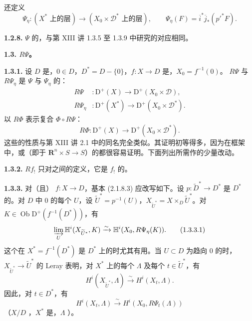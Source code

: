 还定义
\[
 \Psi_\eta:(X^*\text{ 上的层})\longrightarrow
 (X_0\times\mathscr D^*\text{ 上的层}),\qquad
 \Psi_\eta(F)=\overline i^*\overline j_*(p'^*F).
\]

\textbf{1.2.8.} $\Psi$ 的，与第 XIII 讲 1.3.5 至 1.3.9 中研究的对应相同。

\textbf{1.3.  $R\Psi$。}

\textbf{1.3.1.} 设 $D$ 是，$0\in D$，$D^*=D-\{0\}$，$f:X\to D$ 是，$X_0=f^{-1}(0)$。 $R\Psi$ 与 $R\Psi_\eta$ 是 $\Psi$ 与 $\Psi_\eta$ 的：
\[
\begin{aligned}
 R\Psi&:\mathrm D^+(X)\longrightarrow\mathrm D^+(X_0\times\mathscr D),\\
 R\Psi_\eta&:\mathrm D^+(X^*)\longrightarrow\mathrm D^+(X_0\times\mathscr D^*).
\end{aligned}
\]
以 $R\Phi$ 表示复合 $\Phi\circ R\Psi$：
\[
 R\Phi:\mathrm D^+(X)\longrightarrow\mathrm D^+(X_0\times\mathscr D^*).
\]
这些的性质与第 XIII 讲 2.1 中的同名完全类似。其证明初等得多，因为在框架中，或（即于 $\mathbf R^n\times S\to S$）的都很容易证明。下面列出所需作的少量改动。

\textbf{1.3.2.}  $Rf_!$ 只对之间的定义，它是 $f_!$ 的。

\textbf{1.3.3.} 对（且） $f:X\to D$，基本 (2.1.8.3) 应改写如下。设 $p:\widetilde D^*\to D^*$ 是 $D^*$ 的。对 $D$ 中 $0$ 的每个 $U$，设 $\widetilde U^*=p^{-1}(U)$，$X_{\widetilde U^*}=X\times_D\widetilde U^*$。对 $K\in\operatorname{Ob}\mathrm D^+(f^{-1}(D^*))$，有
\[
 \varinjlim_U\mathbb H^i(X_{\widetilde U^*},K)
 \xrightarrow{\sim}\mathbb H^i(X_0,R\Psi_\eta(K)).\tag{1.3.3.1}
\]
这个在 $X^*=f^{-1}(D^*)$ 是 $D^*$ 上的时尤其有用。当 $U\subset D$ 为趋向 $0$ 的时，
$X_{\widetilde U^*}\to\widetilde U^*$ 的 Leray 表明，对 $X^*$ 上的每个 $\Lambda$ 及每个 $t\in\widetilde U^*$，有
\[
 H^i(X_{\widetilde U^*},\Lambda)\xrightarrow{\sim}H^i(X_t,\Lambda).
\]
因此，对 $t\in D^*$，有
\[
 H^i(X_t,\Lambda)\xrightarrow{\sim}H^i(X_0,R\Psi_t(\Lambda))\tag{1.3.3.2}
\]
（$X/D$ ，$X^*$ 是，$\Lambda$ ）。

